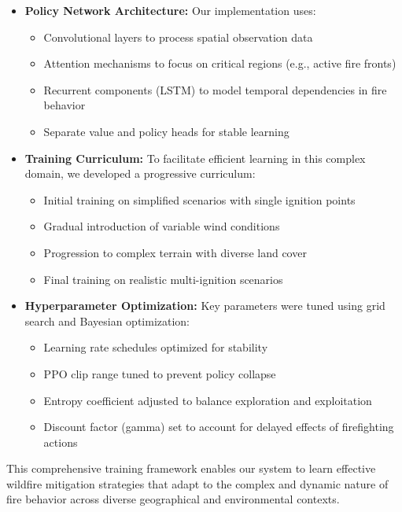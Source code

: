 \documentclass[conference]{IEEEtran}
\begin{document}
\begin{itemize}
    \item \textbf{Policy Network Architecture:} Our implementation uses:
    \begin{itemize}
        \item Convolutional layers to process spatial observation data
        \item Attention mechanisms to focus on critical regions (e.g., active fire fronts)
        \item Recurrent components (LSTM) to model temporal dependencies in fire behavior
        \item Separate value and policy heads for stable learning
    \end{itemize}
    
    \item \textbf{Training Curriculum:} To facilitate efficient learning in this complex domain, we developed a progressive curriculum:
    \begin{itemize}
        \item Initial training on simplified scenarios with single ignition points
        \item Gradual introduction of variable wind conditions
        \item Progression to complex terrain with diverse land cover
        \item Final training on realistic multi-ignition scenarios
    \end{itemize}
    
    \item \textbf{Hyperparameter Optimization:} Key parameters were tuned using grid search and Bayesian optimization:
    \begin{itemize}
        \item Learning rate schedules optimized for stability
        \item PPO clip range tuned to prevent policy collapse
        \item Entropy coefficient adjusted to balance exploration and exploitation
        \item Discount factor (gamma) set to account for delayed effects of firefighting actions
    \end{itemize}
\end{itemize}

\noindent
This comprehensive training framework enables our system to learn effective wildfire mitigation strategies that adapt to the complex and dynamic nature of fire behavior across diverse geographical and environmental contexts.
\end{document}
